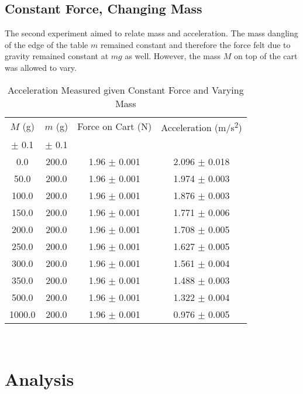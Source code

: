 \documentclass[11pt]{article}
\begin{document}
\subsection{Constant Force, Changing Mass}
The second experiment aimed to relate mass and acceleration. The mass dangling of the edge of the table \(m\) remained constant and therefore the force felt due to gravity remained constant at \(m g\) as well. However, the mass \(M\) on top of the cart was allowed to vary.
\begin{table}[h]
	\centering
	\caption{Acceleration Measured given Constant Force and Varying Mass}
	\begin{tabular}{|c|c|c|c|}
		\hline
		\(M\) (g) & \(m\) (g) & Force on Cart (N) & Acceleration (m/s\textsuperscript{2})
		\\
		\(\pm\) 0.1 & \(\pm\) 0.1  & &\\
		\hline
		0.0 & 200.0 & 1.96  \(\pm\) 0.001 & 2.096 \(\pm\) 0.018 \\
		50.0 & 200.0 & 1.96 \(\pm\) 0.001 & 1.974 \(\pm\) 0.003 \\
		100.0 & 200.0 & 1.96 \(\pm\) 0.001 & 1.876 \(\pm\) 0.003 \\
		150.0 & 200.0 & 1.96 \(\pm\) 0.001 & 1.771 \(\pm\) 0.006 \\
		200.0 & 200.0 & 1.96 \(\pm\) 0.001 & 1.708 \(\pm\) 0.005 \\
		250.0 & 200.0 & 1.96 \(\pm\) 0.001 & 1.627 \(\pm\) 0.005 \\
		300.0 & 200.0 & 1.96 \(\pm\) 0.001 & 1.561 \(\pm\) 0.004 \\
		350.0 & 200.0 & 1.96 \(\pm\) 0.001 & 1.488 \(\pm\) 0.003 \\
		500.0 & 200.0 & 1.96 \(\pm\) 0.001 & 1.322 \(\pm\) 0.004 \\
		1000.0 & 200.0 & 1.96 \(\pm\) 0.001 & 0.976 \(\pm\) 0.005 \\
		
		\hline
	\end{tabular}
\end{table}
\\
\section{Analysis}
\end{document}
